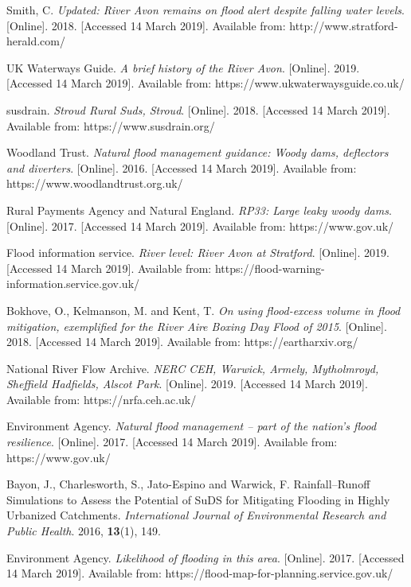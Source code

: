 \documentclass[11pt,a4paper]{article}
\begin{document}
\begin{thebibliography}{}
Smith, C. \textit{Updated: River Avon remains on flood alert despite falling water levels}. [Online]. 2018. [Accessed 14 March 2019]. Available from: http://www.stratford-herald.com/

UK Waterways Guide. \textit{A brief history of the River Avon}. [Online]. 2019. [Accessed 14 March 2019]. Available from: https://www.ukwaterwaysguide.co.uk/

\bibitem{}
susdrain. \textit{Stroud Rural Suds, Stroud}. [Online]. 2018. [Accessed 14 March 2019]. Available from: https://www.susdrain.org/

\bibitem{}
Woodland Trust. \textit{Natural flood management guidance: Woody dams, deflectors and diverters}. [Online]. 2016. [Accessed 14 March 2019]. Available from: https://www.woodlandtrust.org.uk/

Rural Payments Agency and Natural England. \textit{RP33: Large leaky woody dams}. [Online]. 2017. [Accessed 14 March 2019]. Available from: https://www.gov.uk/

Flood information service. \textit{River level: River Avon at Stratford}. [Online]. 2019. [Accessed 14 March 2019]. Available from: https://flood-warning-information.service.gov.uk/

Bokhove, O., Kelmanson, M. and Kent, T. \textit{On using flood-excess volume in flood mitigation, exemplified for the River Aire Boxing Day Flood of 2015}. [Online]. 2018. [Accessed 14 March 2019]. Available from: https://eartharxiv.org/

National River Flow Archive. \textit{NERC CEH, Warwick, Armely, Mytholmroyd, Sheffield Hadfields, Alscot Park}. [Online]. 2019. [Accessed 14 March 2019]. Available from: https://nrfa.ceh.ac.uk/

Environment Agency. \textit{Natural flood management – part of the nation’s flood resilience}. [Online]. 2017. [Accessed 14 March 2019]. Available from: https://www.gov.uk/

Bayon, J., Charlesworth, S., Jato-Espino and Warwick, F. Rainfall–Runoff Simulations to Assess the Potential of SuDS for Mitigating Flooding in Highly Urbanized Catchments. \textit{International Journal of Environmental Research and Public Health}. 2016, \textbf{13}(1), 149.

Environment Agency. \textit{Likelihood of flooding in this area}. [Online]. 2017. [Accessed 14 March 2019]. Available from: https://flood-map-for-planning.service.gov.uk/


\end{thebibliography}
\end{document}
